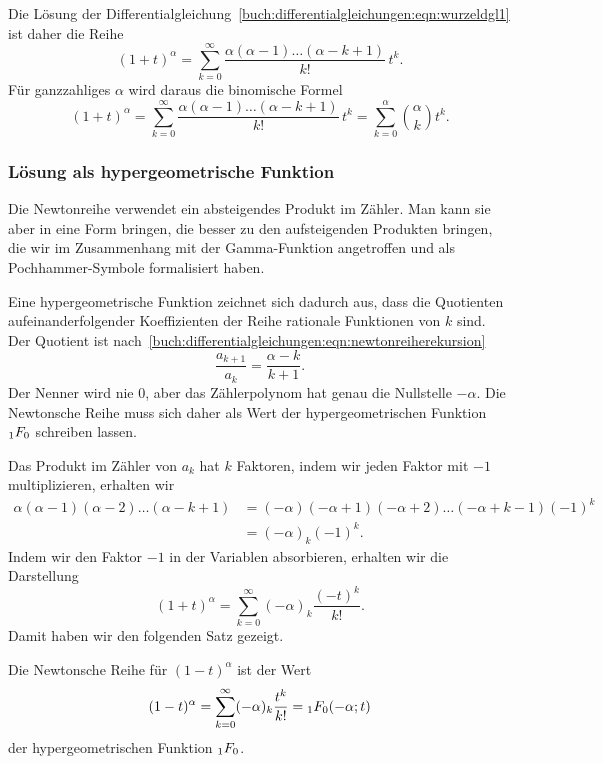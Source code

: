 Die Lösung der 
Differentialgleichung~\eqref{buch:differentialgleichungen:eqn:wurzeldgl1}
ist daher die Reihe
\begin{equation}
(1+t)^\alpha
=
\sum_{k=0}^\infty
\frac{\alpha(\alpha-1)\dots(\alpha-k+1)}{k!}\, t^k.
\label{buch:differentialgleichungen:eqn:newtonreihe}
\end{equation}
Für ganzzahliges $\alpha$ wird daraus die binomische Formel
\[
(1+t)^\alpha
=
\sum_{k=0}^\infty
\frac{\alpha(\alpha-1)\dots(\alpha-k+1)}{k!}\, t^k
=
\sum_{k=0}^\alpha \binom{\alpha}{k} t^k.
\]

%
%
\subsubsection{Lösung als hypergeometrische Funktion}
Die Newtonreihe verwendet ein absteigendes Produkt im Zähler.
Man kann sie aber in eine Form bringen, die besser zu den aufsteigenden
Produkten bringen, die wir im Zusammenhang mit der Gamma-Funktion
angetroffen und als Pochhammer-Symbole formalisiert haben.

Eine hypergeometrische Funktion zeichnet sich dadurch aus, dass
die Quotienten aufeinanderfolgender Koeffizienten der Reihe rationale
Funktionen von $k$ sind.
Der Quotient ist
nach~\eqref{buch:differentialgleichungen:eqn:newtonreiherekursion}
\[
\frac{a_{k+1}}{a_k}
=
\frac{\alpha-k}{k+1}.
\]
Der Nenner wird nie $0$, aber das Zählerpolynom hat genau die Nullstelle
$-\alpha$.
Die Newtonsche Reihe muss sich daher als Wert der hypergeometrischen
Funktion $\mathstrut_1F_0$ schreiben lassen.
%

Das Produkt im Zähler von $a_k$ hat $k$ Faktoren, indem wir jeden Faktor
mit $-1$ multiplizieren, erhalten wir
\begin{align*}
\alpha(\alpha-1)(\alpha-2)\dots(\alpha-k+1)
&=
(-\alpha)(-\alpha+1)(-\alpha+2)\dots(-\alpha+k-1) (-1)^k
\\
&=
(-\alpha)_k (-1)^k.
\end{align*}
Indem wir den Faktor $-1$ in der Variablen absorbieren, erhalten
wir die Darstellung
\[
(1+t)^\alpha
=
\sum_{k=0}^\infty
(-\alpha)_k\frac{(-t)^k}{k!}.
\]
Damit haben wir den folgenden Satz gezeigt.

\begin{satz}
%
\label{buch:differentialgleichungen:satz:newtonschereihe}
Die Newtonsche Reihe für $(1-t)^\alpha$ ist der Wert
\[
(1-t)^\alpha
=
\sum_{k=0}^\infty (-\alpha)_k \frac{t^k}{k!}
=
\mathstrut_1F_0(-\alpha;t)
\]
der hypergeometrischen Funktion $\mathstrut_1F_0$.
\end{satz}

